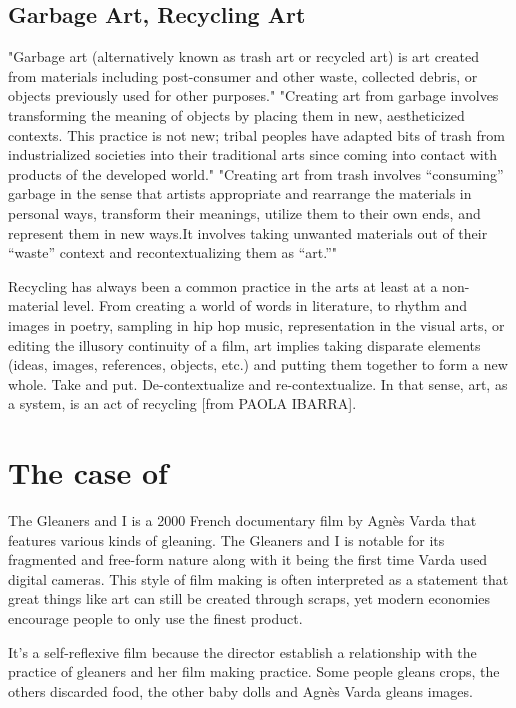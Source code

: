 \subsection{Garbage Art, Recycling Art}
"Garbage art (alternatively known as trash art or recycled art) is art created from materials including post-consumer and other waste, collected debris, or objects previously used for other purposes." "Creating art from garbage involves transforming the meaning of objects by placing them in new, aestheticized contexts. This practice is not new; tribal peoples have adapted bits of trash from industrialized societies into their traditional arts since coming into contact with products of the developed world." "Creating art from trash involves “consuming” garbage in the sense that artists appropriate and rearrange the materials in personal ways, transform their meanings, utilize them to their own ends, and represent them in new ways.It involves taking unwanted materials out of their “waste” context and recontextualizing them as “art.”" \cite{tauxe2012encyclopedia}

Recycling has always been a common practice in the arts at least at a non-material level. From creating a world of words in literature, to rhythm and images in poetry, sampling in hip hop music, representation in the visual arts, or editing the illusory continuity of a film, art implies taking disparate elements (ideas, images, references, objects, etc.) and putting them together to form a new whole. Take and put. De-contextualize and re-contextualize. In that sense, art, as a system, is an act of recycling [from PAOLA IBARRA].


\section{The case of }
The Gleaners and I is a 2000 French documentary film by Agnès Varda that features various kinds of gleaning. The Gleaners and I is notable for its fragmented and free-form nature along with it being the first time Varda used digital cameras. This style of film making is often interpreted as a statement that great things like art can still be created through scraps, yet modern economies encourage people to only use the finest product.

It's a self-reflexive film because the director establish a relationship with the practice of gleaners and her film making practice. Some people gleans crops, the others discarded food, the other baby dolls and Agnès Varda gleans images.  

